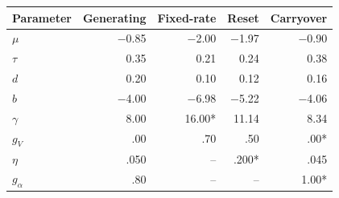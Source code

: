 \begin{center}
\small
\begin{tabular}{@{}lrrrr@{}}
\toprule
Parameter & Generating & Fixed-rate & Reset & Carryover \\
\midrule
$\mu$ & $-$0.85 & $-$2.00 & $-$1.97 & $-$0.90 \\
$\tau$ & 0.35 & 0.21 & 0.24 & 0.38 \\
$d$ & 0.20 & 0.10 & 0.12 & 0.16 \\
$b$ & $-$4.00 & $-$6.98 & $-$5.22 & $-$4.06 \\
$\gamma$ & 8.00 & 16.00* & 11.14 & 8.34 \\
$g_V$ & .00 & .70 & .50 & .00* \\
$\eta$ & .050 & -- & .200* & .045 \\
$g_\alpha$ & .80 & -- & -- & 1.00* \\
\bottomrule
\end{tabular}
\end{center}
